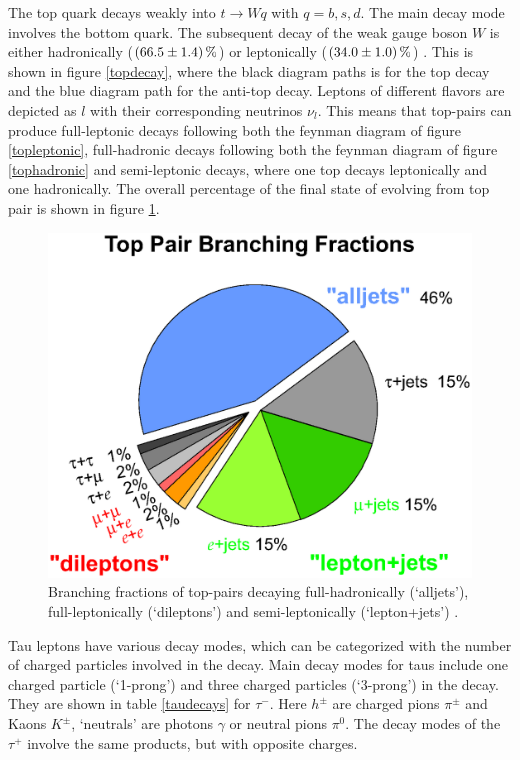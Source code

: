 %
The top quark decays weakly into $t\rightarrow Wq$ with $q=b,s,d$. The main decay mode involves the bottom quark. The subsequent decay of the weak gauge boson $W$ is either hadronically ($\SI[separate-uncertainty = true]{66.5\pm 1.4}{\percent}$) or leptonically ($\SI[separate-uncertainty = true]{34\pm1.0}{\percent}$) \cite{PhysRevD}. This is shown in figure \ref{topdecay}, where the black diagram paths is for the top decay and the blue diagram path for the anti-top decay. Leptons of different flavors are depicted as $l$ with their corresponding neutrinos $\nu_l$. This means that top-pairs can produce full-leptonic decays following both the feynman diagram of figure \ref{topleptonic}, full-hadronic decays following both the feynman diagram of figure \ref{tophadronic} and semi-leptonic decays, where one top decays leptonically and one hadronically. The overall percentage of the final state of evolving from top pair is shown in figure \ref{topcake}.\newline
%
\begin{figure}[htbp]                                 
 \begin{center}                                       
  \includegraphics[width=0.6\linewidth]{figures/top_pair_branching_frac.eps} 
   \caption[Branching fractions of top-pairs.]{Branching fractions of top-pairs decaying full-hadronically (`alljets'), full-leptonically (`dileptons') and semi-leptonically (`lepton+jets') \cite{D0}. }
  \label{topcake}                                     
 \end{center}
\end{figure}
%
Tau leptons have various decay modes, which can be categorized with the number of charged particles involved in the decay. Main decay modes for taus include one charged particle (`1-prong') and three charged particles (`3-prong') in the decay. They are shown in table \ref{taudecays} for $\tau^-$. Here $h^{\pm}$ are charged pions $\pi^\pm$ and Kaons $K^\pm$, `neutrals' are photons $\gamma$ or neutral pions $\pi^0$. The decay modes of the $\tau^+$ involve the same products, but with opposite charges.\par
